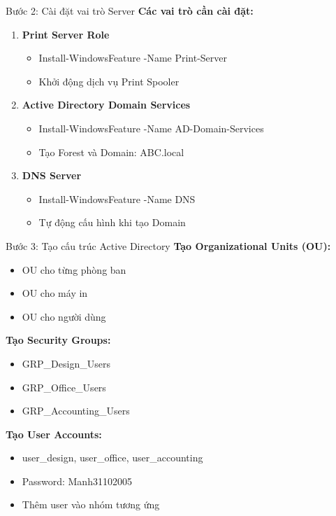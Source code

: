 \documentclass{beamer}
\begin{document}
    \begin{frame}{Bước 2: Cài đặt vai trò Server}
        \textbf{Các vai trò cần cài đặt:}
        \begin{enumerate}
            \item \textbf{Print Server Role}
                \begin{itemize}
                    \item Install-WindowsFeature -Name Print-Server
                    \item Khởi động dịch vụ Print Spooler
                \end{itemize}
            \item \textbf{Active Directory Domain Services}
                \begin{itemize}
                    \item Install-WindowsFeature -Name AD-Domain-Services
                    \item Tạo Forest và Domain: ABC.local
                \end{itemize}
            \item \textbf{DNS Server}
                \begin{itemize}
                    \item Install-WindowsFeature -Name DNS
                    \item Tự động cấu hình khi tạo Domain
                \end{itemize}
        \end{enumerate}
    \end{frame}
    
    \begin{frame}{Bước 3: Tạo cấu trúc Active Directory}
        \textbf{Tạo Organizational Units (OU):}
        \begin{itemize}
            \item OU cho từng phòng ban
            \item OU cho máy in
            \item OU cho người dùng
        \end{itemize}
        
        \vspace{0.3cm}
        \textbf{Tạo Security Groups:}
        \begin{itemize}
            \item GRP\_Design\_Users
            \item GRP\_Office\_Users
            \item GRP\_Accounting\_Users
        \end{itemize}
        
        \vspace{0.3cm}
        \textbf{Tạo User Accounts:}
        \begin{itemize}
            \item user\_design, user\_office, user\_accounting
            \item Password: Manh31102005
            \item Thêm user vào nhóm tương ứng
        \end{itemize}
    \end{frame}
\end{document}
